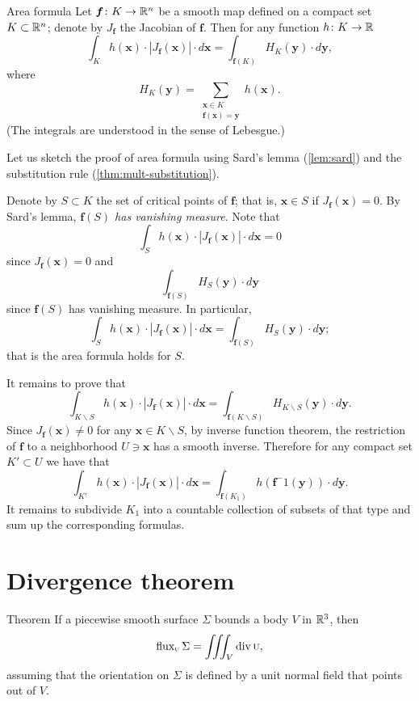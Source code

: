\begin{thm}{Area formula}\label{thm:area-formula}
Let $\bm{f}\colon K\to\mathbb{R}^n$ be a smooth map defined on a compact set $K\subset \mathbb{R}^n$;
denote by $J_{\bm{f}}$ the Jacobian of $\bm{f}$.
Then for any function $h\colon K\to \mathbb{R}$
\[\int_K h(\bm{x})\cdot |J_{\bm{f}}(\bm{x})|\cdot d\bm{x}=\int_{\bm{f}(K)} H_K(\bm{y})\cdot d\bm{y},\]
where 
\[H_K(\bm{y})=\sum_{\substack{\bm{x}\in K \\ \bm{f}(\bm{x})=\bm{y}}}h(\bm{x}).\]
(The integrals are understood in the sense of Lebesgue.)
\end{thm}

Let us sketch the proof of area formula using  Sard's lemma (\ref{lem:sard}) and the substitution rule (\ref{thm:mult-substitution}).

Denote by $S\subset K$ the set of critical points of $\bm{f}$; that is, $\bm{x}\in S$ if $J_{\bm{f}}(\bm{x})=0$.
By Sard's lemma,
\emph{$\bm{f}(S)$ has vanishing measure}.
Note that 
\[\int_S h(\bm{x})\cdot |J_{\bm{f}}(\bm{x})|\cdot d\bm{x}=0\]
since $J_{\bm{f}}(\bm{x})=0$
and
\[\int_{\bm{f}(S)} H_S(\bm{y})\cdot d\bm{y}\]
since $\bm{f}(S)$ has vanishing measure.
In particular,
\[\int_S h(\bm{x})\cdot |J_{\bm{f}}(\bm{x})|\cdot d\bm{x}=\int_{\bm{f}(S)} H_S(\bm{y})\cdot d\bm{y};\]
that is the area formula holds for $S$.

It remains to prove that 
\[\int_{K\backslash S} h(\bm{x})\cdot |J_{\bm{f}}(\bm{x})|\cdot d\bm{x}=\int_{\bm{f}(K\backslash S)} H_{K\backslash S}(\bm{y})\cdot d\bm{y}.\]
Since $J_{\bm{f}}(\bm{x})\ne 0$ for any $\bm{x}\in K\backslash S$, by inverse function theorem, the restriction of $\bm{f}$ to a neighborhood $U\ni\bm{x}$ has a smooth inverse.
Therefore for any compact set $K'\subset U$ we have that %
\[\int_{K'}h(\bm{x})\cdot |J_{\bm{f}}(\bm{x})|\cdot d\bm{x}=\int_{\bm{f}(K_1)} h(\bm{f}^-1(\bm{y}))\cdot d\bm{y}.\]
It remains to subdivide $K_1$ into a countable collection of subsets of that type and sum up the corresponding formulas.\qeds

\section{Divergence theorem}

\begin{thm}{Theorem}\label{thm:div}
If a piecewise smooth surface $\Sigma$ bounds a body $V$ in $\mathbb{R}^3$, then
\[\mathop{\rm flux}\nolimits_{\textsc u}\Sigma=\iiint_V\mathop{\rm div}\nolimits \textsc u,\]
assuming that the orientation on $\Sigma$ is defined by a unit normal field that points out of $V$.
\end{thm}


